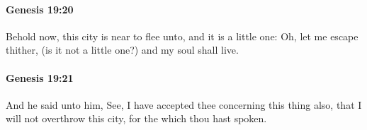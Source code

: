 		\paragraph{Genesis 19:20} %
			\label{GENESIS-19-20}

			Behold now, this city is near to flee unto, and it is a little one: Oh, let me escape thither, (is it not a little one?) and my soul shall live.


		\paragraph{Genesis 19:21} %
			\label{GENESIS-19-21}

			And he said unto him, See, I have accepted thee concerning this thing also, that I will not overthrow this city, for the which thou hast spoken.


